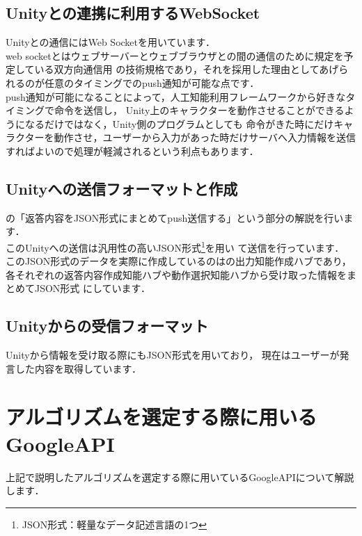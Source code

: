 \subsection{Unityとの連携に利用するWebSocket}
Unityとの通信にはWeb Socketを用いています．\\

web socketとはウェブサーバーとウェブブラウザとの間の通信のために規定を予定している双方向通信用
の技術規格であり，それを採用した理由としてあげられるのが任意のタイミングでのpush通知が可能な点です．\\

push通知が可能になることによって，人工知能利用フレームワークから好きなタイミングで命令を送信し，
Unity上のキャラクターを動作させることができるようになるだけではなく，Unity側のプログラムとしても
命令がきた時にだけキャラクターを動作させ，ユーザーから入力があった時だけサーバへ入力情報を送信
すればよいので処理が軽減されるという利点もあります．\\

\subsection{Unityへの送信フォーマットと作成}
の「返答内容をJSON形式にまとめてpush送信する」という部分の解説を行います．\\
このUnityへの送信は汎用性の高いJSON形式\footnote{JSON形式：軽量なデータ記述言語の1つ}を用い
て送信を行っています．\\

このJSON形式のデータを実際に作成しているのはの出力知能作成ハブであり，
各それぞれの返答内容作成知能ハブや動作選択知能ハブから受け取った情報をまとめてJSON形式
にしています．\\


\subsection{Unityからの受信フォーマット}
Unityから情報を受け取る際にもJSON形式を用いており，
現在はユーザーが発言した内容を取得しています．\\


\newpage

\section{アルゴリズムを選定する際に用いるGoogleAPI}
上記で説明したアルゴリズムを選定する際に用いているGoogleAPIについて解説します．\\


